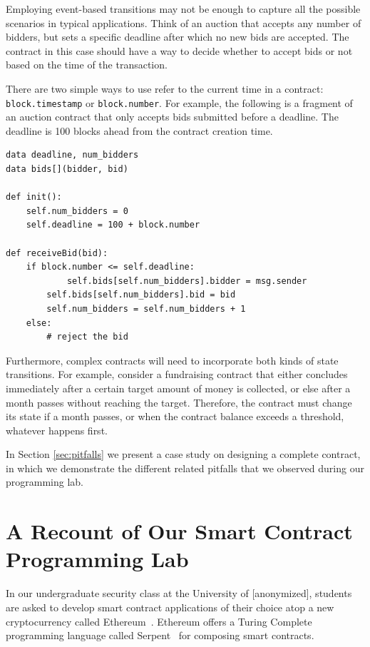 \documentclass[10pt,twocolumn,letterpaper]{article}
\newcommand{\elaine}[1]{{\color{red}{[elaine: #1]}}}
\begin{document}
{Employing event-based transitions may not be enough to capture all the possible scenarios in typical applications. Think of an auction that accepts any number of bidders, but sets a specific deadline after which no new bids are accepted. The contract in this case should have a way to decide whether to accept bids or not based on the time of the transaction.

There are two simple ways to use refer to the current time in a contract: \texttt{block.timestamp} or \texttt{block.number}. For example, the following is a fragment of an auction contract that only accepts bids submitted before a deadline. The deadline is 100 blocks ahead from the contract creation time.

\begin{mdframed}
\begin{verbatim}
data deadline, num_bidders
data bids[](bidder, bid)

def init():
	self.num_bidders = 0
	self.deadline = 100 + block.number                

def receiveBid(bid):
	if block.number <= self.deadline:
    		self.bids[self.num_bidders].bidder = msg.sender
		self.bids[self.num_bidders].bid = bid
		self.num_bidders = self.num_bidders + 1
	else:
		# reject the bid
\end{verbatim}
\end{mdframed}                

Furthermore, complex contracts will need to incorporate both kinds of state transitions. For example, consider a fundraising contract that either concludes immediately after a certain target amount of money is collected, or else after a month passes without reaching the target. Therefore, the contract must change its state if a month passes, or when the contract balance exceeds a threshold, whatever happens first.

In Section \ref{sec:pitfalls} we present a case study on designing a complete contract, in which we demonstrate the different related pitfalls that we observed during our programming lab.
}

\section{A Recount of Our Smart Contract Programming Lab}
\label{sec:lab}
In our undergraduate security class at the University of [anonymized], 
students are asked to develop smart contract applications of their choice
atop a new cryptocurrency called Ethereum~\cite{ethereum}. %
Ethereum offers a Turing Complete programming language
called Serpent~\cite{serpent} for composing smart contracts. 
\end{document}

